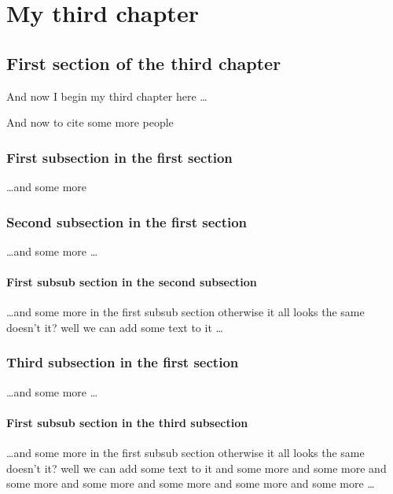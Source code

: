 \chapter{My third chapter}

\ifpdf
  \graphicspath{{Chapter/Chapter3/Figs/Raster/}{Chapter/Chapter3/Figs/PDF/}{Chapter/Chapter3/Figs/}}
\else
  \graphicspath{{Chapter/Chapter3/Figs/Vector/}{Chapter/Chapter3/Figs/}}
\fi

\section{First section of the third chapter}
And now I begin my third chapter here \dots

And now to cite some more people~\citet{Rea85,Ancey1996}

\subsection{First subsection in the first section}
\dots and some more

\subsection{Second subsection in the first section}
\dots and some more \dots

\subsubsection{First subsub section in the second subsection}
\dots and some more in the first subsub section otherwise it all looks the same
doesn't it? well we can add some text to it \dots

\subsection{Third subsection in the first section}
\dots and some more \dots

\subsubsection{First subsub section in the third subsection}
\dots and some more in the first subsub section otherwise it all looks the same
doesn't it? well we can add some text to it and some more and some more and
some more and some more and some more and some more and some more \dots

